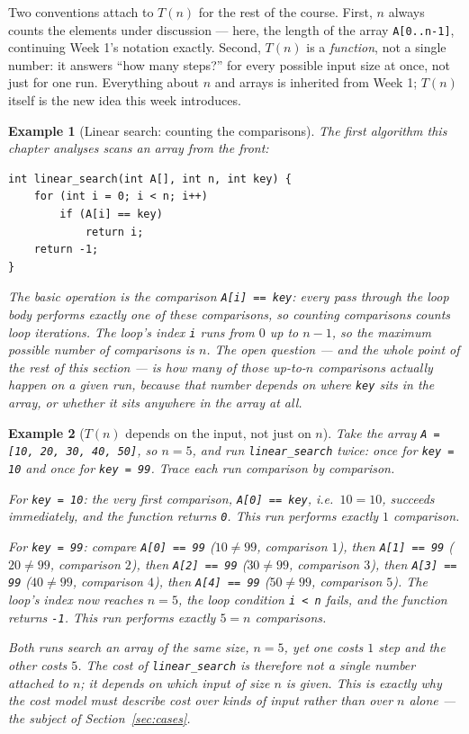 \documentclass[11pt]{article}
\newtheorem{example}{Example}[section]
\begin{document}
Two conventions attach to $T(n)$ for the rest of the course. First, $n$
always counts the elements under discussion --- here, the length of the
array \texttt{A[0..n-1]}, continuing Week 1's notation exactly. Second,
$T(n)$ is a \emph{function}, not a single number: it answers ``how many
steps?'' for every possible input size at once, not just for one run.
Everything about $n$ and arrays is inherited from Week 1; $T(n)$ itself is
the new idea this week introduces.

\begin{example}[Linear search: counting the comparisons]
The first algorithm this chapter analyses scans an array from the front:
\begin{verbatim}
int linear_search(int A[], int n, int key) {
    for (int i = 0; i < n; i++)
        if (A[i] == key)
            return i;
    return -1;
}
\end{verbatim}
The basic operation is the comparison \texttt{A[i] == key}: every pass
through the loop body performs exactly one of these comparisons, so counting
comparisons counts loop iterations. The loop's index \texttt{i} runs from
$0$ up to $n - 1$, so the maximum possible number of comparisons is $n$. The
open question --- and the whole point of the rest of this section --- is
\emph{how many} of those up-to-$n$ comparisons actually happen on a given
run, because that number depends on \emph{where} \texttt{key} sits in the
array, or whether it sits anywhere in the array at all.
\end{example}

\begin{example}[$T(n)$ depends on the input, not just on $n$]
Take the array \texttt{A = [10, 20, 30, 40, 50]}, so $n = 5$, and run
\texttt{linear\_search} twice: once for \texttt{key = 10} and once for
\texttt{key = 99}. Trace each run comparison by comparison.

For \texttt{key = 10}: the very first comparison, \texttt{A[0] == key}, i.e.\
$10 = 10$, succeeds immediately, and the function returns \texttt{0}. This
run performs exactly $1$ comparison.

For \texttt{key = 99}: compare \texttt{A[0] == 99} ($10 \ne 99$, comparison
$1$), then \texttt{A[1] == 99} ($20 \ne 99$, comparison $2$), then
\texttt{A[2] == 99} ($30 \ne 99$, comparison $3$), then \texttt{A[3] == 99}
($40 \ne 99$, comparison $4$), then \texttt{A[4] == 99} ($50 \ne 99$,
comparison $5$). The loop's index now reaches $n = 5$, the loop condition
\texttt{i < n} fails, and the function returns \texttt{-1}. This run performs
exactly $5 = n$ comparisons.

Both runs search an array of the same size, $n = 5$, yet one costs $1$ step
and the other costs $5$. The cost of \texttt{linear\_search} is therefore
not a single number attached to $n$; it depends on \emph{which} input of
size $n$ is given. This is exactly why the cost model must describe cost
over \emph{kinds} of input rather than over $n$ alone --- the subject of
Section~\ref{sec:cases}.
\end{example}
\end{document}

